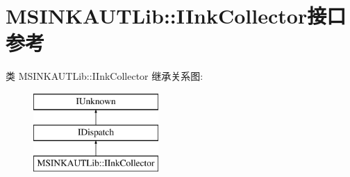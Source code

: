 \hypertarget{interface_m_s_i_n_k_a_u_t_lib_1_1_i_ink_collector}{}\section{M\+S\+I\+N\+K\+A\+U\+T\+Lib\+:\+:I\+Ink\+Collector接口 参考}
\label{interface_m_s_i_n_k_a_u_t_lib_1_1_i_ink_collector}
类 M\+S\+I\+N\+K\+A\+U\+T\+Lib\+:\+:I\+Ink\+Collector 继承关系图\+:\begin{figure}[H]
\begin{center}
\leavevmode
\includegraphics[height=3.000000cm]{interface_m_s_i_n_k_a_u_t_lib_1_1_i_ink_collector}
\end{center}
\end{figure}
